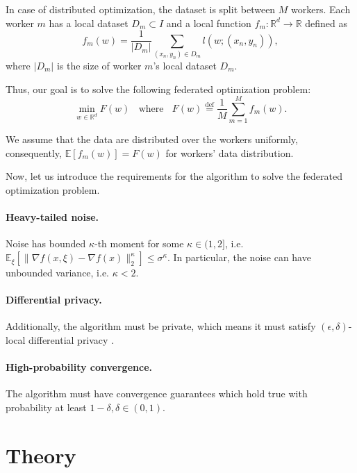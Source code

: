 \documentclass[12pt]{article}
\newcommand{\EE}{\mathbb{E}}
\newcommand{\R}{\mathbb{R}}
\begin{document}
In case of distributed optimization, the dataset is split between $M$ workers. Each worker $m$ has a local dataset $D_m \subset I$ and a local function $f_m:\R^d \to \R$ defined as
\begin{equation}
f_m(w)=\frac{1}{|D_m|}\sum_{(x_n,y_n)\in D_m}l(w;(x_n,y_n)),
\end{equation}
where $|D_m|$ is the size of worker $m$'s local dataset $D_m$.

Thus, our goal is to solve the following federated optimization problem:
\begin{equation}
\min_{w\in \R^d}F(w)~~~~ \text{where}~~~~ F(w) \overset{\mathrm{def}}{=} \frac{1}{M}\sum_{m=1}^{M}f_{m}(w).
\end{equation}

We assume that the data are distributed over the workers uniformly, consequently, $\EE[f_{m}(w)]=F(w)$ for workers' data distribution.

Now, let us introduce the requirements for the algorithm to solve the federated optimization problem.
\paragraph{Heavy-tailed noise.}
Noise has bounded $\kappa$-th moment for some $\kappa \in (1,2]$, i.e. $\EE_\xi[\| \nabla f (x, \xi) - \nabla f(x)\|_2^\kappa] \leq \sigma^\kappa$. In particular, the noise can have unbounded variance, i.e. $\kappa < 2$.

\paragraph{Differential privacy.}
Additionally, the algorithm must be private, which means it must satisfy $(\epsilon,\delta)$-local differential privacy \cite{Dwork2014}.

\paragraph{High-probability convergence.}
The algorithm must have convergence guarantees which hold true with probability at least $1 - \delta, \delta \in (0,1)$.

\section{Theory}
\end{document}
